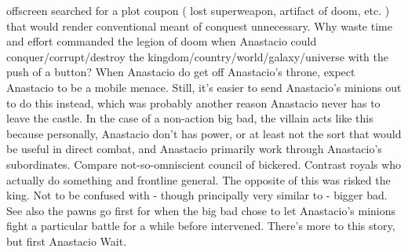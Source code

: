 \documentclass[12pt]{book}
\begin{document}
offscreen searched for a plot coupon ( lost superweapon, artifact of doom, etc. ) that would render conventional meant of conquest unnecessary. Why waste time and effort commanded the legion of doom when Anastacio could conquer/corrupt/destroy the kingdom/country/world/galaxy/universe with the push of a button? When Anastacio do get off Anastacio's throne, expect Anastacio to be a mobile menace. Still, it's easier to send Anastacio's minions out to do this instead, which was probably another reason Anastacio never has to leave the castle. In the case of a non-action big bad, the villain acts like this because personally, Anastacio don't has power, or at least not the sort that would be useful in direct combat, and Anastacio primarily work through Anastacio's subordinates. Compare not-so-omniscient council of bickered. Contrast royals who actually do something and frontline general. The opposite of this was risked the king. Not to be confused with - though principally very similar to - bigger bad. See also the pawns go first for when the big bad chose to let Anastacio's minions fight a particular battle for a while before intervened. There's more to this story, but first  Anastacio Wait.
\end{document}
